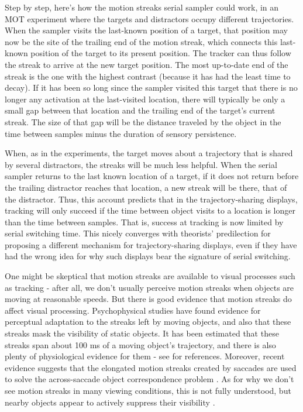 \documentclass[
]{book}
\begin{document}
Step by step, here's how the motion streaks serial sampler could work, in an MOT experiment where the targets and distractors occupy different trajectories. When the sampler visits the last-known position of a target, that position may now be the site of the trailing end of the motion streak, which connects this last-known position of the target to its present position. The tracker can thus follow the streak to arrive at the new target position. The most up-to-date end of the streak is the one with the highest contrast (because it has had the least time to decay). If it has been so long since the sampler visited this target that there is no longer any activation at the last-visited location, there will typically be only a small gap between that location and the trailing end of the target's current streak. The size of that gap will be the distance traveled by the object in the time between samples minus the duration of sensory persistence.

When, as in the \citet{holcombeSplittingAttentionReduces2013} experiments, the target moves about a trajectory that is shared by several distractors, the streaks will be much less helpful. When the serial sampler returns to the last known location of a target, if it does not return before the trailing distractor reaches that location, a new streak will be there, that of the distractor. Thus, this account predicts that in the trajectory-sharing displays, tracking will only succeed if the time between object visits to a location is longer than the time between samples. That is, success at tracking is now limited by serial switching time. This nicely converges with theorists' predilection for proposing a different mechanism for trajectory-sharing displays, even if they have had the wrong idea for why such displays bear the signature of serial switching.

One might be skeptical that motion streaks are available to visual processes such as tracking - after all, we don't usually perceive motion streaks when objects are moving at reasonable speeds. But there is good evidence that motion streaks do affect visual processing. Psychophysical studies have found evidence for perceptual adaptation to the streaks left by moving objects, and also that these streaks mask the visibility of static objects. It has been estimated that these streaks span about 100 ms of a moving object's trajectory, and there is also plenty of physiological evidence for them - see \citet{apthorpSpatialTuningMotion2011} for references. Moreover, recent evidence suggests that the elongated motion streaks created by saccades are used to solve the across-saccade object correspondence problem \citep{schweitzerIntrasaccadicMotionStreaks2020, schweitzerIntrasaccadicMotionStreaks2021}. As for why we don't see motion streaks in many viewing conditions, this is not fully understood, but nearby objects appear to actively suppress their visibility \citep[for a review, see][]{bedellPerceptionMotionSmear2010}.
\end{document}
